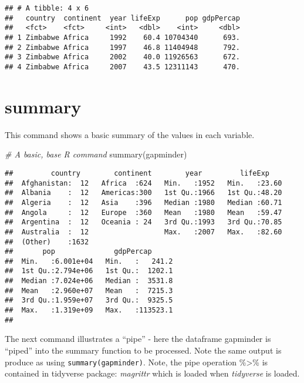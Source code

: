 \documentclass[
]{book}
\newenvironment{Shaded}{\begin{snugshade}}{\end{snugshade}}
\newcommand{\CommentTok}[1]{\textcolor[rgb]{0.56,0.35,0.01}{\textit{#1}}}
\newcommand{\FunctionTok}[1]{\textcolor[rgb]{0.00,0.00,0.00}{#1}}
\newcommand{\NormalTok}[1]{#1}
\begin{document}
\begin{verbatim}
## # A tibble: 4 x 6
##   country  continent  year lifeExp      pop gdpPercap
##   <fct>    <fct>     <int>   <dbl>    <int>     <dbl>
## 1 Zimbabwe Africa     1992    60.4 10704340      693.
## 2 Zimbabwe Africa     1997    46.8 11404948      792.
## 3 Zimbabwe Africa     2002    40.0 11926563      672.
## 4 Zimbabwe Africa     2007    43.5 12311143      470.
\end{verbatim}

\hypertarget{summary}{%
\section{summary}\label{summary}}

This command shows a basic summary of the values in each variable.

\begin{Shaded}
\begin{Highlighting}[]
\CommentTok{\# A basic, base R command}
\FunctionTok{summary}\NormalTok{(gapminder)}
\end{Highlighting}
\end{Shaded}

\begin{verbatim}
##         country        continent        year         lifeExp     
##  Afghanistan:  12   Africa  :624   Min.   :1952   Min.   :23.60  
##  Albania    :  12   Americas:300   1st Qu.:1966   1st Qu.:48.20  
##  Algeria    :  12   Asia    :396   Median :1980   Median :60.71  
##  Angola     :  12   Europe  :360   Mean   :1980   Mean   :59.47  
##  Argentina  :  12   Oceania : 24   3rd Qu.:1993   3rd Qu.:70.85  
##  Australia  :  12                  Max.   :2007   Max.   :82.60  
##  (Other)    :1632                                                
##       pop              gdpPercap       
##  Min.   :6.001e+04   Min.   :   241.2  
##  1st Qu.:2.794e+06   1st Qu.:  1202.1  
##  Median :7.024e+06   Median :  3531.8  
##  Mean   :2.960e+07   Mean   :  7215.3  
##  3rd Qu.:1.959e+07   3rd Qu.:  9325.5  
##  Max.   :1.319e+09   Max.   :113523.1  
## 
\end{verbatim}

The next command illustrates a ``pipe'' - here the dataframe gapminder is ``piped'' into
the summary function to be processed. Note the same output is produce as using
\texttt{summary(gapminder)}. Note, the pipe operation \%\textgreater\% is contained in tidyverse package: \emph{magrittr} which is loaded when \emph{tidyverse} is loaded.
\end{document}

